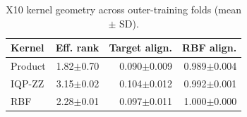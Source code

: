 \begin{table}[t]
\caption{X10 kernel geometry across outer-training folds (mean $\pm$ SD).}
\label{tab:geometry}
\centering
\small
\begin{tabular}{lrrr}
\toprule
Kernel & Eff. rank & Target align. & RBF align. \\
\midrule
Product & 1.82$\pm$0.70 & 0.090$\pm$0.009 & 0.989$\pm$0.004 \\
IQP-ZZ & 3.15$\pm$0.02 & 0.104$\pm$0.012 & 0.992$\pm$0.001 \\
RBF & 2.28$\pm$0.01 & 0.097$\pm$0.011 & 1.000$\pm$0.000 \\
\bottomrule
\end{tabular}
\end{table}
